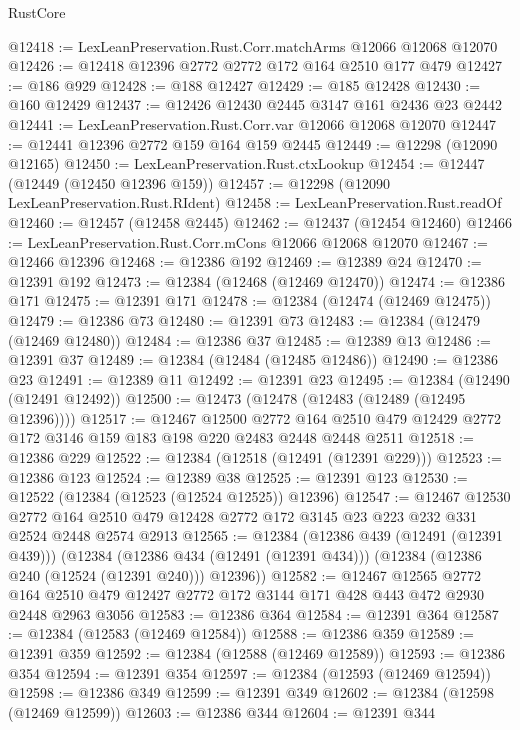 \begin{lexlean}{RustCore}
\begin{coremodule}
@12418 := LexLeanPreservation.Rust.Corr.matchArms @12066 @12068 @12070
@12426 := @12418 @12396 @2772 @2772 @172 @164 @2510 @177 @479
@12427 := @186 @929
@12428 := @188 @12427
@12429 := @185 @12428
@12430 := @160 @12429
@12437 := @12426 @12430 @2445 @3147 @161 @2436 @23 @2442
@12441 := LexLeanPreservation.Rust.Corr.var @12066 @12068 @12070
@12447 := @12441 @12396 @2772 @159 @164 @159 @2445
@12449 := @12298 (@12090 @12165)
@12450 := LexLeanPreservation.Rust.ctxLookup
@12454 := @12447 (@12449 (@12450 @12396 @159))
@12457 := @12298 (@12090 LexLeanPreservation.Rust.RIdent)
@12458 := LexLeanPreservation.Rust.readOf
@12460 := @12457 (@12458 @2445)
@12462 := @12437 (@12454 @12460)
@12466 := LexLeanPreservation.Rust.Corr.mCons @12066 @12068 @12070
@12467 := @12466 @12396
@12468 := @12386 @192
@12469 := @12389 @24
@12470 := @12391 @192
@12473 := @12384 (@12468 (@12469 @12470))
@12474 := @12386 @171
@12475 := @12391 @171
@12478 := @12384 (@12474 (@12469 @12475))
@12479 := @12386 @73
@12480 := @12391 @73
@12483 := @12384 (@12479 (@12469 @12480))
@12484 := @12386 @37
@12485 := @12389 @13
@12486 := @12391 @37
@12489 := @12384 (@12484 (@12485 @12486))
@12490 := @12386 @23
@12491 := @12389 @11
@12492 := @12391 @23
@12495 := @12384 (@12490 (@12491 @12492))
@12500 := @12473 (@12478 (@12483 (@12489 (@12495 @12396))))
@12517 := @12467
    @12500
    @2772
    @164
    @2510
    @479
    @12429
    @2772
    @172
    @3146
    @159
    @183
    @198
    @220
    @2483
    @2448
    @2448
    @2511
@12518 := @12386 @229
@12522 := @12384 (@12518 (@12491 (@12391 @229)))
@12523 := @12386 @123
@12524 := @12389 @38
@12525 := @12391 @123
@12530 := @12522 (@12384 (@12523 (@12524 @12525)) @12396)
@12547 := @12467
    @12530
    @2772
    @164
    @2510
    @479
    @12428
    @2772
    @172
    @3145
    @23
    @223
    @232
    @331
    @2524
    @2448
    @2574
    @2913
@12565 := @12384
    (@12386 @439 (@12491 (@12391 @439)))
    (@12384
      (@12386 @434 (@12491 (@12391 @434)))
      (@12384 (@12386 @240 (@12524 (@12391 @240))) @12396))
@12582 := @12467
    @12565
    @2772
    @164
    @2510
    @479
    @12427
    @2772
    @172
    @3144
    @171
    @428
    @443
    @472
    @2930
    @2448
    @2963
    @3056
@12583 := @12386 @364
@12584 := @12391 @364
@12587 := @12384 (@12583 (@12469 @12584))
@12588 := @12386 @359
@12589 := @12391 @359
@12592 := @12384 (@12588 (@12469 @12589))
@12593 := @12386 @354
@12594 := @12391 @354
@12597 := @12384 (@12593 (@12469 @12594))
@12598 := @12386 @349
@12599 := @12391 @349
@12602 := @12384 (@12598 (@12469 @12599))
@12603 := @12386 @344
@12604 := @12391 @344

\end{coremodule}
\end{lexlean}
